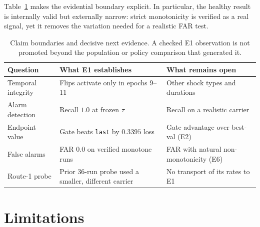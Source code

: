 \documentclass{article} %
\theoremstyle{remark}
\begin{document}
Table~\ref{tab:scope} makes the evidential boundary explicit. In particular, the healthy result is
internally valid but externally narrow: strict monotonicity is verified as a real signal, yet it
removes the variation needed for a realistic FAR test.

\begin{table}[h]
\centering
\caption{Claim boundaries and decisive next evidence. A checked E1 observation is not promoted
beyond the population or policy comparison that generated it.}
\label{tab:scope}
\small
\begin{tabularx}{\linewidth}{@{}lXX@{}}
\toprule
\textbf{Question} & \textbf{What E1 establishes} & \textbf{What remains open} \\
\midrule
Temporal integrity & Flips activate only in epochs 9--11 & Other shock types and durations \\
Alarm detection & Recall $1.0$ at frozen $\tau$ & Recall on a realistic carrier \\
Endpoint value & Gate beats \texttt{last} by $0.3395$ loss & Gate advantage over best-val (E2) \\
False alarms & FAR $0.0$ on verified monotone runs & FAR with natural non-monotonicity (E6) \\
Route-1 probe & Prior 36-run probe used a smaller, different carrier & No transport of its rates to E1 \\
\bottomrule
\end{tabularx}
\end{table}

\section{Limitations}
\label{sec:limits}
\end{document}
